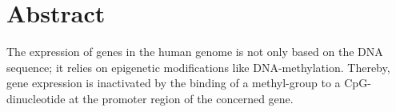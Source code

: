 \section*{Abstract}

The expression of genes in the human genome is not only based on the \ac{DNA} sequence; it relies on epigenetic modifications like \ac{DNA}-methylation. Thereby, gene expression is inactivated by the binding of a methyl-group to a \ac{CpG}-dinucleotide at the promoter region of the concerned gene.

\newpage
\mbox{}
\newpage